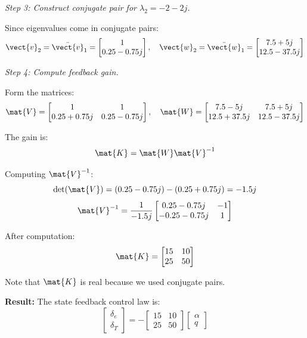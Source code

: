\textit{Step 3: Construct conjugate pair for $\lambda_2 = -2 - 2j$.}

Since eigenvalues come in conjugate pairs:
\begin{equation}
\vect{v}_2 = \bar{\vect{v}}_1 = \begin{bmatrix} 1 \\ 0.25 - 0.75j \end{bmatrix}, \quad
\vect{w}_2 = \bar{\vect{w}}_1 = \begin{bmatrix} 7.5 + 5j \\ 12.5 - 37.5j \end{bmatrix}
\end{equation}

\textit{Step 4: Compute feedback gain.}

Form the matrices:
\begin{equation}
\mat{V} = \begin{bmatrix} 1 & 1 \\ 0.25+0.75j & 0.25-0.75j \end{bmatrix}, \quad
\mat{W} = \begin{bmatrix} 7.5-5j & 7.5+5j \\ 12.5+37.5j & 12.5-37.5j \end{bmatrix}
\end{equation}

The gain is:
\begin{equation}
\mat{K} = \mat{W}\mat{V}^{-1}
\end{equation}

Computing $\mat{V}^{-1}$:
\begin{equation}
\det(\mat{V}) = (0.25-0.75j) - (0.25+0.75j) = -1.5j
\end{equation}
\begin{equation}
\mat{V}^{-1} = \frac{1}{-1.5j}\begin{bmatrix} 0.25-0.75j & -1 \\ -0.25-0.75j & 1 \end{bmatrix}
\end{equation}

After computation:
\begin{equation}
\mat{K} = \begin{bmatrix} 15 & 10 \\ 25 & 50 \end{bmatrix}
\end{equation}

Note that $\mat{K}$ is real because we used conjugate pairs.

\textbf{Result:} The state feedback control law is:
\begin{equation}
\begin{bmatrix} \delta_e \\ \delta_T \end{bmatrix} = -\begin{bmatrix} 15 & 10 \\ 25 & 50 \end{bmatrix}
\begin{bmatrix} \alpha \\ q \end{bmatrix}
\end{equation}

